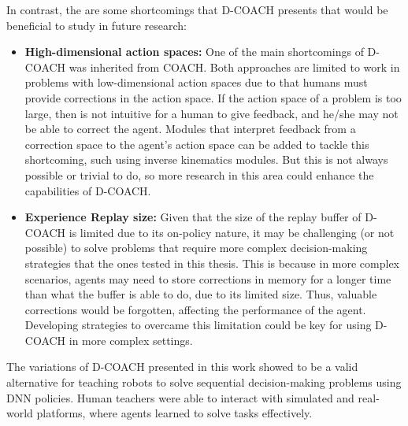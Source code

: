 In contrast, the are some shortcomings that D-COACH presents that would be beneficial to study in future research:
\begin{itemize}
    \item \textbf{High-dimensional action spaces:} One of the main shortcomings of D-COACH was inherited from COACH. Both approaches are limited to work in problems with low-dimensional action spaces due to that humans must provide corrections in the action space. If the action space of a problem is too large, then is not intuitive for a human to give feedback, and he/she may not be able to correct the agent. Modules that interpret feedback from a correction space to the agent's action space can be added to tackle this shortcoming, such using inverse kinematics modules. But this is not always possible or trivial to do, so more research in this area could  enhance the capabilities of D-COACH.
    \item \textbf{Experience Replay size:} Given that the size of the replay buffer of D-COACH is limited due to its on-policy nature, it may be challenging (or not possible) to solve problems that require more complex decision-making strategies that the ones tested in this thesis. This is because in more complex scenarios, agents may need to store corrections in memory for a longer time than what the buffer is able to do, due to its limited size. Thus, valuable corrections would be forgotten, affecting the performance of the agent. Developing strategies to overcame this limitation could be key for using D-COACH in more complex settings. 
\end{itemize}

The variations of D-COACH presented in this work showed to be a valid alternative for teaching robots to solve sequential decision-making problems using DNN policies. Human teachers were able to interact with simulated and real-world platforms, where agents learned to solve tasks effectively.